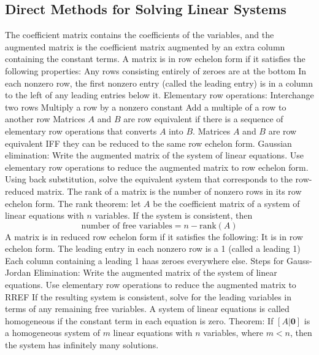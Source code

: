 \documentclass{article}
\begin{document}
        \subsection{Direct Methods for Solving Linear Systems}
        \begin{outline}
            \1 The coefficient matrix contains the coefficients of the variables, and the augmented matrix is the coefficient matrix augmented by an extra column containing the constant terms. 
            \1 A matrix is in row echelon form if it satisfies the following properties: 
                \2 Any rows consisting entirely of zeroes are at the bottom
                \2 In each nonzero row, the first nonzero entry (called the leading entry) is in a column to the left of any leading entries below it. 
            \1 Elementary row operations: 
                \2 Interchange two rows
                \2 Multiply a row by a nonzero constant
                \2 Add a multiple of a row to another row 
            \1 Matrices $A$ and $B$ are row equivalent if there is a sequence of elementary row operations that converts $A$ into $B$. 
            \1 Matrices $A$ and $B$ are row equivalent IFF they can be reduced to the same row echelon form. 
            \1 Gaussian elimination: 
                \2 Write the augmented matrix of the system of linear equations. 
                \2 Use elementary row operations to reduce the augmented matrix to row echelon form. 
                \2 Using back substitution, solve the equivalent system that corresponds to the row-reduced matrix. 
            \1 The rank of a matrix is the number of nonzero rows in its row echelon form. 
            \1 The rank theorem: let $A$ be the coefficient matrix of a system of linear equations with $n$ variables. If the system is consistent, then \[\text{number of free variables}=n-\text{rank}(A)\]
            \1 A matrix is in reduced row echelon form if it satisfies the following:
                \2 It is in row echelon form. 
                \2 The leading entry in each nonzero row is a 1 (called a leading 1)
                \2 Each column containing a leading 1 haas zeroes everywhere else. 
            \1 Steps for Gauss-Jordan Elimination: 
                \2 Write the augmented matrix of the system of linear equations. 
                \2 Use elementary row operations to reduce the augmented matrix to RREF
                \2 If the resulting system is consistent, solve for the leading variables in terms of any remaining free variables. 
            \1 A system of linear equations is called homogeneous if the constant term in each equation is zero. 
            \1 Theorem: If \([A|\mathbf 0]\) is a homogeneous system of $m$ linear equations with $n$ variables, where \(m<n\), then the system has infinitely many solutions. 

        \end{outline}
\end{document}
